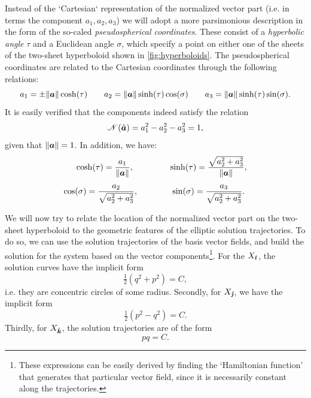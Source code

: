 Instead of the `Cartesian` representation of the normalized vector part (i.e. in terms the component $a_1, a_2, a_3$) we will adopt a more parsimonious description in the form of the so-caled \emph{pseudospherical coordinates}. These consist of a \emph{hyperbolic angle} $\tau$  and a Euclidean angle $\sigma$, which specify a point on either one of the sheets of the two-sheet hyperboloid shown in \cref{fig:hyperboloids}. The pseudospherical coordinates are related to the Cartesian coordinates through the following relations:
\begin{equation}
    a_1 = \pm\norm{\vec{a}}\cosh(\tau) \qquad a_2 = \norm{\vec{a}}\sinh(\tau) \cos(\sigma) \qquad a_3 = \norm{\vec{a}}\sinh(\tau) \sin(\sigma).
\end{equation}
It is easily verified that the components indeed satisfy the relation
\begin{equation} 
    \mathscr{N}(\uvec{a}) = a_1^2 - a_2^2 - a_3^2 = 1, 
\end{equation}
given that $\norm{\vec{a}} = 1$. In addition, we have:
\begin{equation} 
    \begin{array}{cc}
        \displaystyle \cosh(\tau) = \frac{a_1}{\norm{\vec{a}}}, \quad & \quad 
        \displaystyle \sinh(\tau) = \frac{\sqrt{a_2^2 + a_3^2}}{\norm{\vec{a}}}, \\[0.5cm]
        \displaystyle \cos(\sigma) = \frac{a_2}{\sqrt{a_2^2 + a_3^2}}, \qquad & \quad
        \displaystyle \sin(\sigma) = \frac{a_3}{\sqrt{a_2^2 + a_3^2}}. 
    \end{array}
    \label{eq:hyperb_coordinate_relations}
\end{equation}

We will now try to relate the location of the normalized vector part on the two-sheet hyperboloid to the geometric features of the elliptic solution trajectories. To do so, we can use the solution trajectories of the basis vector fields, and build the solution for the system based on the vector components\footnote{These expressions can be easily derived by finding the `Hamiltonian function' that generates that particular vector field, since it is necessarily constant along the trajectories.}. For the $X_\quati$, the solution curves have the implicit form 
$$ \tfrac{1}{2}(q^2 + p^2) = C, $$
i.e. they are concentric circles of some radius. Secondly, for $X_\quatj$, we have the implicit form
$$ \tfrac{1}{2}(p^2 - q^2) = C.  $$
Thirdly, for $X_\quatk$, the solution trajectories are of the form
$$ pq = C. $$

